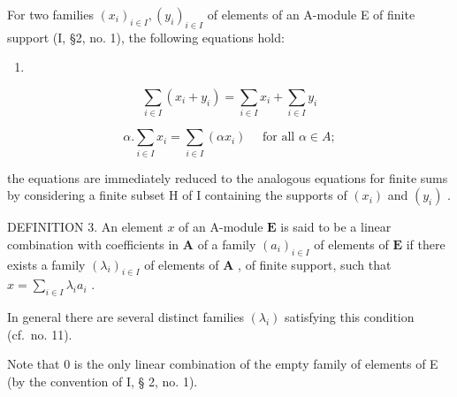 For two families \((x_{i})_{i\in I}, (y_{i})_{i\in I}\) of elements of an A-module E of finite support (I, §2, no. 1), the following equations hold:

\begin{enumerate}
\def\labelenumi{(\arabic{enumi})}
\tightlist
\item
\end{enumerate}

\[
\sum_ {i \in I} (x _ {i} + y _ {i}) = \sum_ {i \in I} x _ {i} + \sum_ {i \in I} y _ {i}\tag{2}
\]

\[
\alpha . \sum_ {i \in I} x _ {i} = \sum_ {i \in I} (\alpha x _ {i}) \quad \text { for   all } \alpha \in A;
\]

the equations are immediately reduced to the analogous equations for finite sums by considering a finite subset H of I containing the supports of \((x_{i})\) and \((y_{i})\) .

DEFINITION 3. An element \(x\) of an A-module \(\mathbf{E}\) is said to be a linear combination with coefficients in \(\mathbf{A}\) of a family \((a_{i})_{i\in I}\) of elements of \(\mathbf{E}\) if there exists a family \((\lambda_{i})_{i\in I}\) of elements of \(\mathbf{A}\) , of finite support, such that \(x = \sum_{i\in I}\lambda_{i}a_{i}\) .

In general there are several distinct families \((\lambda_{i})\) satisfying this condition (cf.~no. 11).

Note that 0 is the only linear combination of the empty family of elements of E (by the convention of I, § 2, no. 1).

